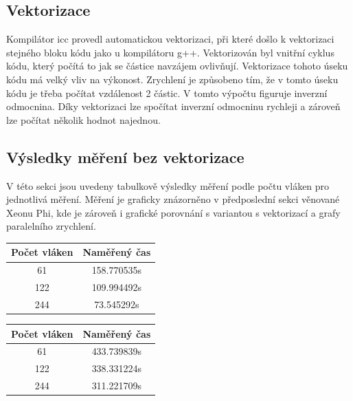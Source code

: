 \documentclass[12pt]{article}
\begin{document}
\subsection{Vektorizace}
Kompilátor icc provedl automatickou vektorizaci, při které došlo k vektorizaci stejného bloku kódu jako u kompilátoru g++. Vektorizován byl vnitřní cyklus kódu, který počítá to jak se částice navzájem ovlivňují. Vektorizace tohoto úseku kódu má velký vliv na výkonost. Zrychlení je způsobeno tím, že v tomto úseku kódu je třeba počítat vzdálenost 2 částic. V tomto výpočtu figuruje inverzní odmocnina. Díky vektorizaci lze spočítat inverzní odmocninu rychleji a zároveň  lze počítat několik hodnot najednou.

\subsection{Výsledky měření bez vektorizace}
V této sekci jsou uvedeny tabulkově výsledky měření podle počtu vláken pro jednotlivá měření.
Měření je graficky znázorněno v předposlední sekci věnované Xeonu Phi, kde je zároveň i grafické porovnání s variantou s vektorizací a grafy paralelního zrychlení.
\begin{table}[H]
\parbox{.45\linewidth}{
%
%
\begin{center}
\begin{tabular}{ c | c }
\textbf{Počet vláken} & \textbf{Naměřený čas} \\ \hline \hline 
61 & 158.770535s \\ \hline
122 & 109.994492s \\ \hline
244 & 73.545292s \\ \hline
\end{tabular}
\end{center}
}
\hfill
\parbox{.45\linewidth}{
%
%
\begin{center}
\begin{tabular}{ c | c }
\textbf{Počet vláken} & \textbf{Naměřený čas} \\ \hline \hline 
61 & 433.739839s \\ \hline
122 & 338.331224s \\ \hline
244 & 311.221709s \\ \hline
\end{tabular}
\end{center}
}
\end{table}
\end{document}

